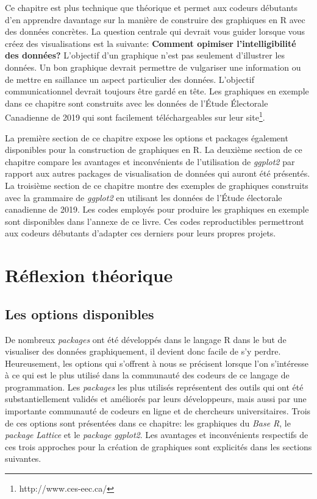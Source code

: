 \documentclass[
  letterpaper,
]{scrbook}
\begin{document}
Ce chapitre est plus technique que théorique et permet aux codeurs
débutants d'en apprendre davantage sur la manière de construire des
graphiques en R avec des données concrètes. La question centrale qui
devrait vous guider lorsque vous créez des visualisations est la
suivante: \textbf{Comment opimiser l'intelligibilité des données?}
L'objectif d'un graphique n'est pas seulement d'illustrer les données.
Un bon graphique devrait permettre de vulgariser une information ou de
mettre en saillance un aspect particulier des données. L'objectif
communicationnel devrait toujours être gardé en tête. Les graphiques en
exemple dans ce chapitre sont construits avec les données de l'Étude
Électorale Canadienne de 2019 qui sont facilement téléchargeables sur
leur site\footnote{http://www.ces-eec.ca/}.

La première section de ce chapitre expose les options et packages
également disponibles pour la construction de graphiques en R. La
deuxième section de ce chapitre compare les avantages et inconvénients
de l'utilisation de \emph{ggplot2} par rapport aux autres packages de
visualisation de données qui auront été présentés. La troisième section
de ce chapitre montre des exemples de graphiques construits avec la
grammaire de \emph{ggplot2} en utilisant les données de l'Étude
électorale canadienne de 2019. Les codes employés pour produire les
graphiques en exemple sont disponibles dans l'annexe de ce livre. Ces
codes reproductibles permettront aux codeurs débutants d'adapter ces
derniers pour leurs propres projets.

\hypertarget{ruxe9flexion-thuxe9orique}{%
\section{Réflexion théorique}\label{ruxe9flexion-thuxe9orique}}

\hypertarget{les-options-disponibles}{%
\subsection{Les options disponibles}\label{les-options-disponibles}}

De nombreux \emph{packages} ont été développés dans le langage R dans le
but de visualiser des données graphiquement, il devient donc facile de
s'y perdre. Heureusement, les options qui s'offrent à nous se précisent
lorsque l'on s'intéresse à ce qui est le plus utilisé dans la communauté
des codeurs de ce langage de programmation. Les \emph{packages} les plus
utilisés représentent des outils qui ont été substantiellement validés
et améliorés par leurs développeurs, mais aussi par une importante
communauté de codeurs en ligne et de chercheurs universitaires. Trois de
ces options sont présentées dans ce chapitre: les graphiques du
\emph{Base R}, le \emph{package} \emph{Lattice} et le \emph{package}
\emph{ggplot2}. Les avantages et inconvénients respectifs de ces trois
approches pour la création de graphiques sont explicités dans les
sections suivantes.
\end{document}
